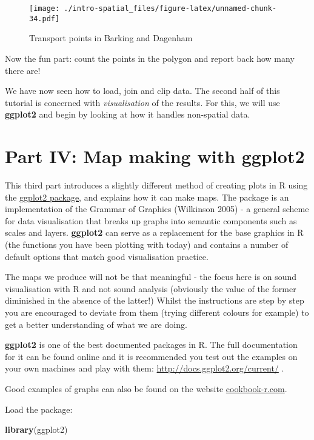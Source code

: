 \documentclass[]{article}
\newenvironment{Shaded}{}{}
\newcommand{\KeywordTok}[1]{\textcolor[rgb]{0.00,0.44,0.13}{\textbf{{#1}}}}
\newcommand{\NormalTok}[1]{{#1}}
\begin{document}
\begin{figure}[htbp]
\centering
\texttt{[image: ./intro-spatial\_files/figure-latex/unnamed-chunk-34.pdf]}
\caption{Transport points in Barking and Dagenham}
\end{figure}

Now the fun part: count the points in the polygon and report back how
many there are!

We have now seen how to load, join and clip data. The second half of
this tutorial is concerned with \emph{visualisation} of the results. For
this, we will use \textbf{ggplot2} and begin by looking at how it
handles non-spatial data.

\section{Part IV: Map making with
ggplot2}\label{part-iv-map-making-with-ggplot2}

This third part introduces a slightly different method of creating plots
in R using the \href{http://ggplot2.org/}{ggplot2 package}, and explains
how it can make maps. The package is an implementation of the Grammar of
Graphics (Wilkinson 2005) - a general scheme for data visualisation that
breaks up graphs into semantic components such as scales and layers.
\textbf{ggplot2} can serve as a replacement for the base graphics in R
(the functions you have been plotting with today) and contains a number
of default options that match good visualisation practice.

The maps we produce will not be that meaningful - the focus here is on
sound visualisation with R and not sound analysis (obviously the value
of the former diminished in the absence of the latter!) Whilst the
instructions are step by step you are encouraged to deviate from them
(trying different colours for example) to get a better understanding of
what we are doing.

\textbf{ggplot2} is one of the best documented packages in R. The full
documentation for it can be found online and it is recommended you test
out the examples on your own machines and play with them:
\url{http://docs.ggplot2.org/current/} .

Good examples of graphs can also be found on the website
\href{http://www.cookbook-r.com/Graphs/}{cookbook-r.com}.

Load the package:

\begin{Shaded}
\begin{Highlighting}[]
\KeywordTok{library}\NormalTok{(ggplot2)}
\end{Highlighting}
\end{Shaded}
\end{document}
